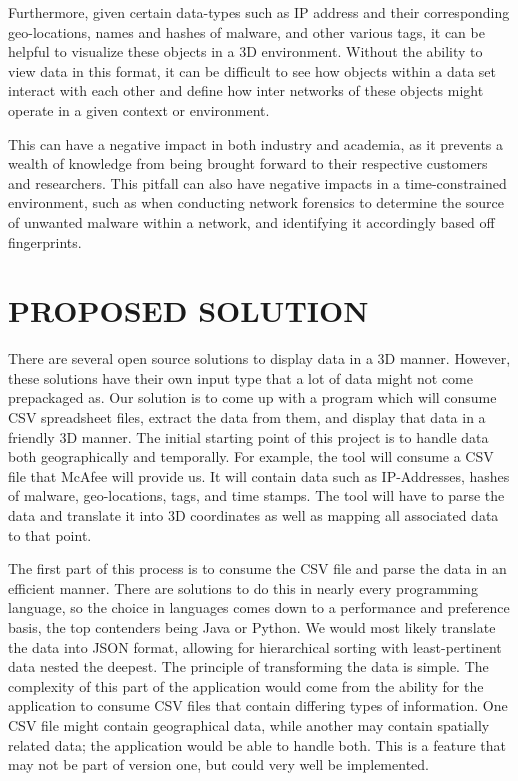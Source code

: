 \documentclass[journal,10pt,onecolumn,compsoc]{IEEEtran} \usepackage[margin=1.0in]{geometry} \usepackage{pdfpages}
\begin{document}
    Furthermore, given certain data-types such as IP address and their corresponding geo-locations, names and hashes of malware, and other various tags, it can be helpful to visualize these objects in a 3D environment. Without the ability to view data in this format, it can be difficult to see how objects within a data set interact with each other and define how inter networks of these objects might operate in a given context or environment.
    
    This can have a negative impact in both industry and academia, as it prevents a wealth of knowledge from being brought forward to their respective customers and researchers. This pitfall can also have negative impacts in a time-constrained environment, such as when conducting network forensics to determine the source of unwanted malware within a network, and identifying it accordingly based off fingerprints.

\section{PROPOSED SOLUTION}
    There are several open source solutions to display data in a 3D manner. However, these solutions have their own input type that a lot of data might not come prepackaged as. Our solution is to come up with a program which will consume CSV spreadsheet files, extract the data from them, and display that data in a friendly 3D manner. The initial starting point of this project is to handle data both geographically and temporally. For example, the tool will consume a CSV file that McAfee will provide us. It will contain data such as IP-Addresses, hashes of malware, geo-locations, tags, and time stamps. The tool will have to parse the data and translate it into 3D coordinates as well as mapping all associated data to that point.
    
    The first part of this process is to consume the CSV file and parse the data in an efficient manner. There are solutions to do this in nearly every programming language, so the choice in languages comes down to a performance and preference basis, the top contenders being Java or Python. We would most likely translate the data into JSON format, allowing for hierarchical sorting with least-pertinent data nested the deepest. The principle of transforming the data is simple. The complexity of this part of the application would come from the ability for the application to consume CSV files that contain differing types of information. One CSV file might contain geographical data, while another may contain spatially related data; the application would be able to handle both. This is a feature that may not be part of version one, but could very well be implemented.
    
\end{document}
